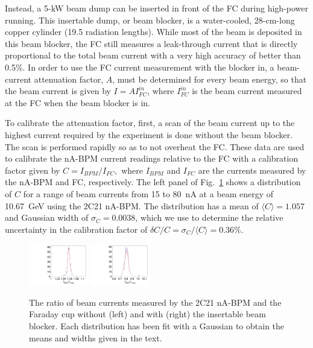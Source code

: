 Instead, a 5-kW beam dump can be inserted in front of the FC during high-power running. This insertable dump, or
beam blocker, is a water-cooled, 28-cm-long copper cylinder (19.5 radiation lengths). While most of the beam is
deposited in this beam blocker, the FC still measures a leak-through current that is directly proportional to the
total beam current with a very high accuracy of better than 0.5\%. In order to use the FC current measurement
with the blocker in, a beam-current attenuation factor, $A$, must be determined for every beam energy, so that
the beam current is given by $I=A I_{FC}^{in}$, where $I_{FC}^{in}$ is the beam current measured at the FC when
the beam blocker is in. 

To calibrate the attenuation factor, first, a scan of the beam current up to the highest current required by the
experiment is done without the beam blocker. The scan is performed rapidly so as to not overheat the FC. These
data are used to calibrate the nA-BPM current readings relative to the FC with a calibration factor given by
$C={I_{BPM}}/{I_{FC}},$ where $I_{BPM}$ and $I_{FC}$ are the currents measured by the nA-BPM and FC,
respectively. The left panel of Fig.~\ref{fig:2c21fc} shows a distribution of $C$ for a range of beam currents
from 15 to 80~nA at a beam energy of 10.67~GeV using the 2C21 nA-BPM. The distribution has a mean of
$\langle C\rangle=1.057$ and Gaussian width of $\sigma_C=0.0038$, which we use to determine the relative
uncertainty in the calibration factor of $\delta C/C=\sigma_C/\langle C\rangle=0.36$\%.
 
\begin{figure}[ht]
\begin{center}
\includegraphics[width=0.23\textwidth]{fCup_2C21_ratio_highcurr.pdf}
\includegraphics[width=0.23\textwidth]{BB_attenuation_2c21_highcurr.pdf}
\caption{The ratio of beam currents measured by the 2C21 nA-BPM and the Faraday cup without (left) and with
  (right) the insertable beam blocker. Each distribution has been fit with a Gaussian to obtain the means and widths
  given in the text.}
\label{fig:2c21fc}
\end{center}
\end{figure}
 

